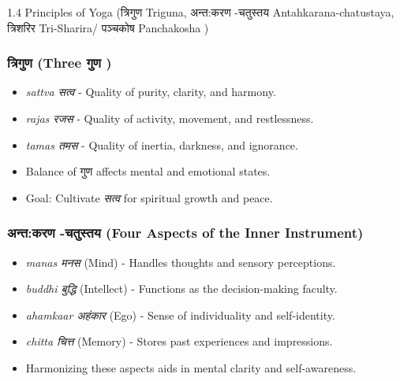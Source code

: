 \begin{frame}[fragile]\frametitle{}
\begin{center}
{\Large 1.4 Principles of Yoga (त्रिगुण Triguna, अन्त:करण -चतुस्तय Antahkarana-chatustaya, त्रिशरिर  Tri-Sharira/  पञ्चकोष Panchakosha )}
\end{center}
\end{frame}

\begin{frame}[fragile]\frametitle{त्रिगुण  (Three गुण )}

      \begin{itemize}
		\item \textit{sattva सत्व } - Quality of purity, clarity, and harmony.
		\item \textit{rajas रजस } - Quality of activity, movement, and restlessness.
		\item \textit{tamas तमस } - Quality of inertia, darkness, and ignorance.
		\item Balance of गुण  affects mental and emotional states.
		\item Goal: Cultivate \textit{सत्व} for spiritual growth and peace.
	  \end{itemize}

\end{frame}

\begin{frame}[fragile]\frametitle{अन्त:करण -चतुस्तय  (Four Aspects of the Inner Instrument)}

      \begin{itemize}
		\item \textit{manas मनस } (Mind) - Handles thoughts and sensory perceptions.
		\item \textit{buddhi बुद्धि } (Intellect) - Functions as the decision-making faculty.
		\item \textit{ahamkaar अहंकार } (Ego) - Sense of individuality and self-identity.
		\item \textit{chitta चित्त } (Memory) - Stores past experiences and impressions.
		\item Harmonizing these aspects aids in mental clarity and self-awareness.
	  \end{itemize}

\end{frame}

